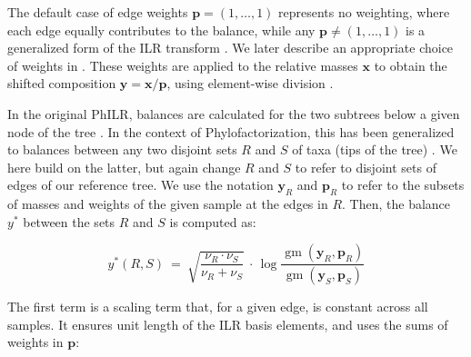 The default case of edge weights $\bm{p} = ( 1, \ldots, 1 )$ represents no weighting,
where each edge equally contributes to the balance,
while any $\bm{p} \neq ( 1, \ldots, 1 )$ is a generalized form of the ILR transform \cite{Silverman2017}.
We later describe an appropriate choice of weights
in .
These weights are applied to the relative masses $\bm{x}$ to obtain the shifted composition $\bm{y} = \bm{x} / \bm{p}$,
using element-wise division \cite{Egozcue2016}.

In the original PhILR, balances are calculated for the two subtrees below a given node of the tree \cite{Silverman2017}.
In the context of Phylofactorization, this has been generalized
to balances between any two disjoint sets $R$ and $S$ of taxa (tips of the tree) \cite{Washburne2017a}.
We here build on the latter, but again change $R$ and $S$ to refer to disjoint sets of edges of our reference tree.
We use the notation $\bm{y}_R$ and $\bm{p}_R$ to refer
to the subsets of masses and weights of the given sample at the edges in $R$.
Then, the balance $y^*$ between the sets $R$ and $S$ is computed as:

\begin{equation}
    \label{ch:Balances:sec:Methods:eq:Balance}
    y^*( R, S ) ~=~ \sqrt{ \frac{ \nu_R \cdot \nu_S }{ \nu_R + \nu_S }} ~\cdot\,
                \log \frac{ \operatorname{gm}( \bm{y}_R, \bm{p}_{R} ) }{ \operatorname{gm}( \bm{y}_S, \bm{p}_{S} ) }
\end{equation}

The first term is a scaling term that, for a given edge, is constant across all samples.
It ensures unit length of the ILR basis elements, and uses the sums of weights in $\bm{p}$:

